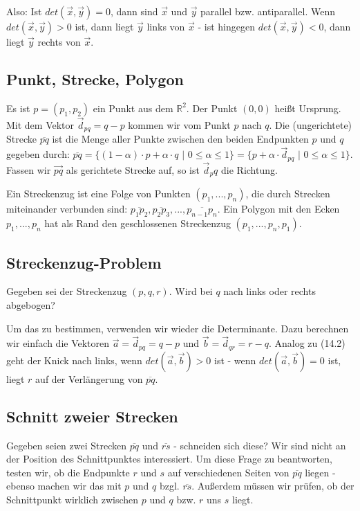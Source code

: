 \documentclass[12pt]{article}
\begin{document}
Also: Ist $det(\vec{x},\vec{y}) = 0$, dann sind $\vec{x}$ und $\vec{y}$ parallel bzw. antiparallel. Wenn $det(\vec{x},\vec{y}) > 0$ ist, dann liegt $\vec{y}$ links von $\vec{x}$ - ist hingegen $det(\vec{x},\vec{y}) < 0$, dann liegt $\vec{y}$ rechts von $\vec{x}$.

\subsection{Punkt, Strecke, Polygon}

Es ist $p = (p_1, p_2)$ ein Punkt aus dem $\mathbb{R}^2$. Der Punkt $(0,0)$ heißt Ursprung. Mit dem Vektor $\vec{d}_{pq} = q - p$ kommen wir vom Punkt $p$ nach $q$. Die (ungerichtete) Strecke $\overline{pq}$ ist die Menge aller Punkte zwischen den beiden Endpunkten $p$ und $q$ gegeben durch: $\overline{pq} = \{(1-\alpha) \cdot p + \alpha \cdot q$ $|$ $0 \leq \alpha \leq 1\} = \{p + \alpha \cdot \vec{d}_{pq}$ $|$ $0 \leq \alpha \leq 1\}$. Fassen wir $\vec{pq}$ als gerichtete Strecke auf, so ist $\vec{d}_pq$ die Richtung.

Ein Streckenzug ist eine Folge von Punkten $(p_1, ..., p_n)$, die durch Strecken miteinander verbunden sind: $\overline{p_1p_2}, \overline{p_2p_3}, ..., \overline{p_{n-1}p_n}$. Ein Polygon mit den Ecken $p_1, ..., p_n$ hat als Rand den geschlossenen Streckenzug $(p_1, ..., p_n, p_1)$.

\subsection{Streckenzug-Problem}

Gegeben sei der Streckenzug $(p, q, r)$. Wird bei $q$ nach links oder rechts abgebogen?

Um das zu bestimmen, verwenden wir wieder die Determinante. Dazu berechnen wir einfach die Vektoren $\vec{a} = \vec{d}_{pq} = q - p$ und $\vec{b} = \vec{d}_{qr} = r - q$. Analog zu (14.2) geht der Knick nach links, wenn $det(\vec{a}, \vec{b}) > 0$ ist - wenn $det(\vec{a}, \vec{b}) = 0$ ist, liegt $r$ auf der Verlängerung von $\overline{pq}$.

\subsection{Schnitt zweier Strecken}

Gegeben seien zwei Strecken $\overline{pq}$ und $\overline{rs}$ - schneiden sich diese? Wir sind nicht an der Position des Schnittpunktes interessiert. Um diese Frage zu beantworten, testen wir, ob die Endpunkte $r$ und $s$ auf verschiedenen Seiten von $\overline{pq}$ liegen - ebenso machen wir das mit $p$ und $q$ bzgl. $\overline{rs}$. Außerdem müssen wir prüfen, ob der Schnittpunkt wirklich zwischen $p$ und $q$ bzw. $r$ uns $s$ liegt.
\end{document}
